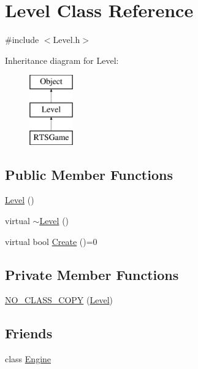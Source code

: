 \section{Level Class Reference}
\label{class_level}


{\ttfamily \#include $<$Level.\-h$>$}

Inheritance diagram for Level\-:\begin{figure}[H]
\begin{center}
\leavevmode
\includegraphics[height=3.000000cm]{class_level}
\end{center}
\end{figure}
\subsection*{Public Member Functions}
\begin{DoxyCompactItemize}
\item 
\hyperlink{class_level_a7a696c928ca5d5354db6e50e46d0f67d}{Level} ()
\item 
virtual \hyperlink{class_level_ad04be01a11723a3d7d8efce4ae1884f2}{$\sim$\-Level} ()
\item 
virtual bool \hyperlink{class_level_a4e61df981fd942c123cdf984511d885c}{Create} ()=0
\end{DoxyCompactItemize}
\subsection*{Private Member Functions}
\begin{DoxyCompactItemize}
\item 
\hyperlink{class_level_a5f66f4841452b5c827b29ca00507d1ad}{N\-O\-\_\-\-C\-L\-A\-S\-S\-\_\-\-C\-O\-P\-Y} (\hyperlink{class_level}{Level})
\end{DoxyCompactItemize}
\subsection*{Friends}
\begin{DoxyCompactItemize}
\item 
class \hyperlink{class_level_a3e1914489e4bed4f9f23cdeab34a43dc}{Engine}
\end{DoxyCompactItemize}



